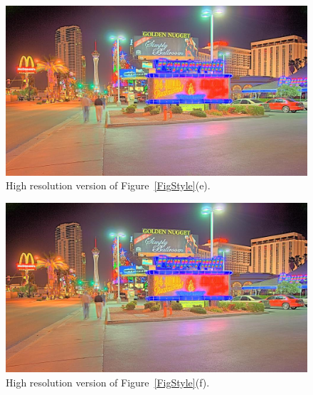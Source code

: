 \begin{figure}
\begin{center}
\includegraphics[width=\textwidth]{figures/chapter5/style_based/Peppermill_hdrcandy_v1_small.jpg}
\caption{High resolution version of Figure~\ref{FigStyle}(e).}
\end{center}
\end{figure}

\begin{figure}
\begin{center}
\includegraphics[width=\textwidth]{figures/chapter5/style_based/Peppermill_hdrcandy_v2_small.jpg}
\caption{High resolution version of Figure~\ref{FigStyle}(f).}
\end{center}
\end{figure}

